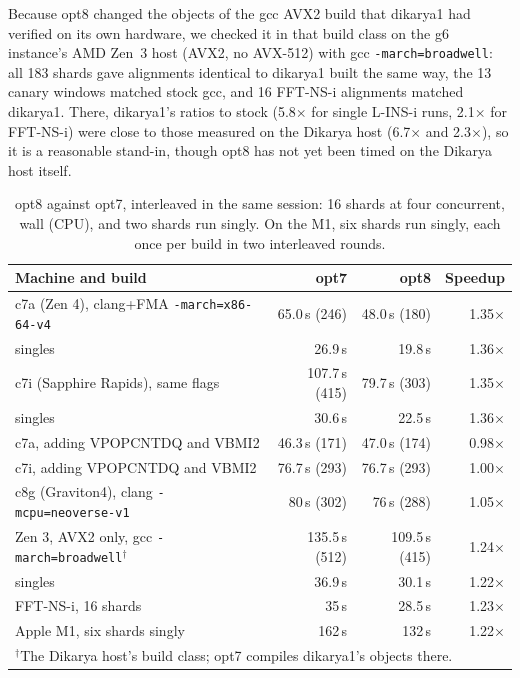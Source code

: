 \documentclass[11pt]{article}
\newcommand{\code}[1]{\texttt{#1}}
\begin{document}
Because opt8 changed the objects of the gcc AVX2 build that dikarya1 had verified on its own
hardware, we checked it in that build class on the g6 instance's AMD Zen~3 host (AVX2, no
AVX-512) with gcc \code{-march=broadwell}: all 183 shards gave alignments identical to dikarya1
built the same way, the 13 canary windows matched stock gcc, and 16 FFT-NS-i alignments matched
dikarya1. There, dikarya1's ratios to stock (5.8$\times$ for single L-INS-i runs, 2.1$\times$ for
FFT-NS-i) were close to those measured on the Dikarya host (6.7$\times$ and 2.3$\times$), so it is a
reasonable stand-in, though opt8 has not yet been timed on the Dikarya host itself.

\begin{table}[h]
\centering
\caption{opt8 against opt7, interleaved in the same session: 16 shards at four concurrent,
wall (CPU), and two shards run singly. On the M1, six shards run singly, each once per build
in two interleaved rounds.}
\label{tab:opt8}
\begin{tabular}{lrrr}
\toprule
Machine and build & opt7 & opt8 & Speedup \\
\midrule
c7a (Zen 4), clang+FMA \code{-march=x86-64-v4} & 65.0\,s (246) & 48.0\,s (180) & 1.35$\times$ \\
\quad singles & 26.9\,s & 19.8\,s & 1.36$\times$ \\
c7i (Sapphire Rapids), same flags & 107.7\,s (415) & 79.7\,s (303) & 1.35$\times$ \\
\quad singles & 30.6\,s & 22.5\,s & 1.36$\times$ \\
c7a, adding VPOPCNTDQ and VBMI2 & 46.3\,s (171) & 47.0\,s (174) & 0.98$\times$ \\
c7i, adding VPOPCNTDQ and VBMI2 & 76.7\,s (293) & 76.7\,s (293) & 1.00$\times$ \\
c8g (Graviton4), clang \code{-mcpu=neoverse-v1} & 80\,s (302) & 76\,s (288) & 1.05$\times$ \\
Zen 3, AVX2 only, gcc \code{-march=broadwell}$^\dagger$ & 135.5\,s (512) & 109.5\,s (415) & 1.24$\times$ \\
\quad singles & 36.9\,s & 30.1\,s & 1.22$\times$ \\
\quad FFT-NS-i, 16 shards & 35\,s & 28.5\,s & 1.23$\times$ \\
Apple M1, six shards singly & 162\,s & 132\,s & 1.22$\times$ \\
\bottomrule
\multicolumn{4}{l}{\footnotesize $^\dagger$The Dikarya host's build class; opt7 compiles dikarya1's objects there.}
\end{tabular}
\end{table}
\end{document}
